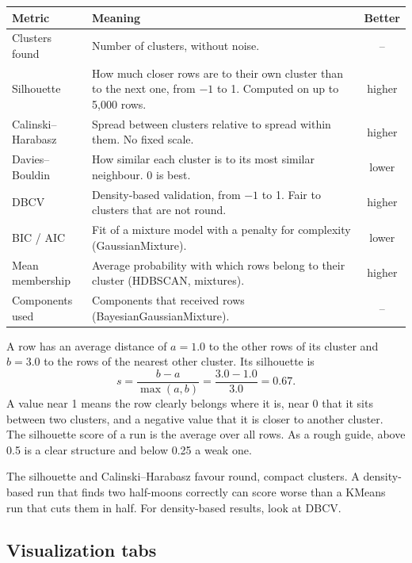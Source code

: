 \documentclass[11pt,a4paper]{article}
\begin{document}
\begin{center}
\begin{tabularx}{\textwidth}{lLc}
\toprule
Metric & Meaning & Better\\
\midrule
Clusters found & Number of clusters, without noise. & --\\
Silhouette & How much closer rows are to their own cluster than to the next one, from $-1$ to 1. Computed on up to
  5{,}000 rows. & higher\\
Calinski--Harabasz & Spread between clusters relative to spread within them. No fixed scale. & higher\\
Davies--Bouldin & How similar each cluster is to its most similar neighbour. 0 is best. & lower\\
DBCV & Density-based validation, from $-1$ to 1. Fair to clusters that are not round. & higher\\
BIC / AIC & Fit of a mixture model with a penalty for complexity (GaussianMixture). & lower\\
Mean membership & Average probability with which rows belong to their cluster (HDBSCAN, mixtures). & higher\\
Components used & Components that received rows (BayesianGaussianMixture). & --\\
\bottomrule
\end{tabularx}
\end{center}

\begin{example}
A row has an average distance of $a = 1.0$ to the other rows of its cluster and $b = 3.0$ to the rows of the
nearest other cluster. Its silhouette is
\[
  s = \frac{b-a}{\max(a,b)} = \frac{3.0-1.0}{3.0} = 0.67 .
\]
A value near 1 means the row clearly belongs where it is, near 0 that it sits between two clusters, and a negative
value that it is closer to another cluster. The silhouette score of a run is the average over all rows. As a rough
guide, above 0.5 is a clear structure and below 0.25 a weak one.
\end{example}

\begin{note}
The silhouette and Calinski--Harabasz favour round, compact clusters. A density-based run that finds two
half-moons correctly can score worse than a KMeans run that cuts them in half. For density-based results, look at
DBCV.
\end{note}

\subsection{Visualization tabs}
\end{document}
